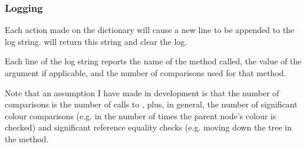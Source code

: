 \subsubsection{Logging}

Each action made on the dictionary will cause a new line to be appended to the log string.  will return this string and clear the log.

Each line of the log string reports the name of the method called, the value of the argument if applicable, and the number of comparisons used for that method.

Note that an assumption I have made in development is that the number of comparisons is the number of calls to , plus, in general, the number of significant colour comparisons (e.g. in  the number of times the parent node's colour is checked) and significant reference equality checks (e.g. moving down the tree in the  method.